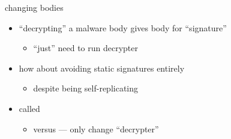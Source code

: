 
\begin{frame}{changing bodies}
    \begin{itemize}
    \item ``decrypting'' a malware body gives body for ``signature''
        \begin{itemize}
        \item ``just'' need to run decrypter
        \end{itemize}
    \item how about avoiding static signatures entirely 
        \begin{itemize}
        \item despite being self-replicating
        \end{itemize}
    \item called 
        \begin{itemize}
        \item versus  --- only change ``decrypter''
        \end{itemize}
    \end{itemize}
\end{frame}

